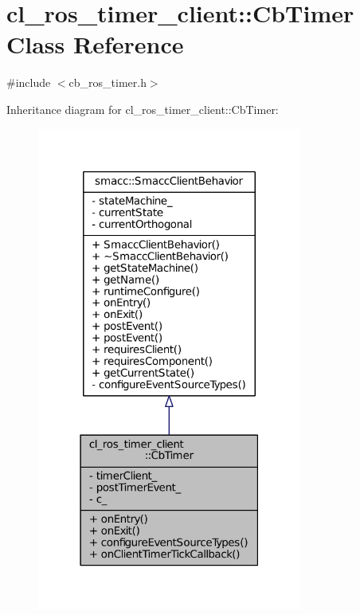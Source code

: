 \hypertarget{classcl__ros__timer__client_1_1CbTimer}{}\section{cl\+\_\+ros\+\_\+timer\+\_\+client\+:\+:Cb\+Timer Class Reference}
\label{classcl__ros__timer__client_1_1CbTimer}


{\ttfamily \#include $<$cb\+\_\+ros\+\_\+timer.\+h$>$}



Inheritance diagram for cl\+\_\+ros\+\_\+timer\+\_\+client\+:\+:Cb\+Timer\+:
\nopagebreak
\begin{figure}[H]
\begin{center}
\leavevmode
\includegraphics[width=247pt]{classcl__ros__timer__client_1_1CbTimer__inherit__graph}
\end{center}
\end{figure}


